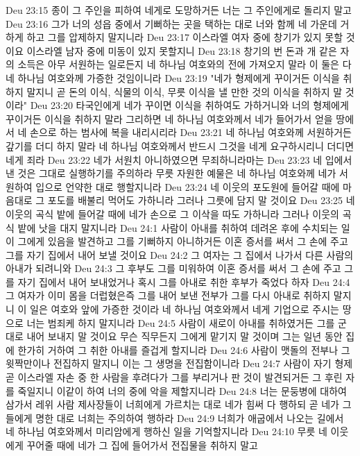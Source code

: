 Deu 23:15  종이 그 주인을 피하여 네게로 도망하거든 너는 그 주인에게로 돌리지 말고
Deu 23:16  그가 너의 성읍 중에서 기뻐하는 곳을 택하는 대로 너와 함께 네 가운데 거하게 하고 그를 압제하지 말지니라
Deu 23:17  이스라엘 여자 중에 창기가 있지 못할 것이요 이스라엘 남자 중에 미동이 있지 못할지니
Deu 23:18  창기의 번 돈과 개 같은 자의 소득은 아무 서원하는 일로든지 네 하나님 여호와의 전에 가져오지 말라 이 둘은 다 네 하나님 여호와께 가증한 것임이니라
Deu 23:19  "네가 형제에게 꾸이거든 이식을 취하지 말지니 곧 돈의 이식, 식물의 이식, 무릇 이식을 낼 만한 것의 이식을 취하지 말 것이라"
Deu 23:20  타국인에게 네가 꾸이면 이식을 취하여도 가하거니와 너의 형제에게 꾸이거든 이식을 취하지 말라 그리하면 네 하나님 여호와께서 네가 들어가서 얻을 땅에서 네 손으로 하는 범사에 복을 내리시리라
Deu 23:21  네 하나님 여호와께 서원하거든 갚기를 더디 하지 말라 네 하나님 여호와께서 반드시 그것을 네게 요구하시리니 더디면 네게 죄라
Deu 23:22  네가 서원치 아니하였으면 무죄하니라마는
Deu 23:23  네 입에서 낸 것은 그대로 실행하기를 주의하라 무릇 자원한 예물은 네 하나님 여호와께 네가 서원하여 입으로 언약한 대로 행할지니라
Deu 23:24  네 이웃의 포도원에 들어갈 때에 마음대로 그 포도를 배불리 먹어도 가하니라 그러나 그릇에 담지 말 것이요
Deu 23:25  네 이웃의 곡식 밭에 들어갈 때에 네가 손으로 그 이삭을 따도 가하니라 그러나 이웃의 곡식 밭에 낫을 대지 말지니라
Deu 24:1  사람이 아내를 취하여 데려온 후에 수치되는 일이 그에게 있음을 발견하고 그를 기뻐하지 아니하거든 이혼 증서를 써서 그 손에 주고 그를 자기 집에서 내어 보낼 것이요
Deu 24:2  그 여자는 그 집에서 나가서 다른 사람의 아내가 되려니와
Deu 24:3  그 후부도 그를 미워하여 이혼 증서를 써서 그 손에 주고 그를 자기 집에서 내어 보내었거나 혹시 그를 아내로 취한 후부가 죽었다 하자
Deu 24:4  그 여자가 이미 몸을 더럽혔은즉 그를 내어 보낸 전부가 그를 다시 아내로 취하지 말지니 이 일은 여호와 앞에 가증한 것이라 네 하나님 여호와께서 네게 기업으로 주시는 땅으로 너는 범죄케 하지 말지니라
Deu 24:5  사람이 새로이 아내를 취하였거든 그를 군대로 내어 보내지 말 것이요 무슨 직무든지 그에게 맡기지 말 것이며 그는 일년 동안 집에 한가히 거하여 그 취한 아내를 즐겁게 할지니라
Deu 24:6  사람이 맷돌의 전부나 그 윗짝만이나 전집하지 말지니 이는 그 생명을 전집함이니라
Deu 24:7  사람이 자기 형제 곧 이스라엘 자손 중 한 사람을 후려다가 그를 부리거나 판 것이 발견되거든 그 후린 자를 죽일지니 이같이 하여 너의 중에 악을 제할지니라
Deu 24:8  너는 문둥병에 대하여 삼가서 레위 사람 제사장들이 너희에게 가르치는 대로 네가 힘써 다 행하되 곧 네가 그들에게 명한 대로 너희는 주의하여 행하라
Deu 24:9  너희가 애굽에서 나오는 길에서 네 하나님 여호와께서 미리암에게 행하신 일을 기억할지니라
Deu 24:10  무릇 네 이웃에게 꾸어줄 때에 네가 그 집에 들어가서 전집물을 취하지 말고
